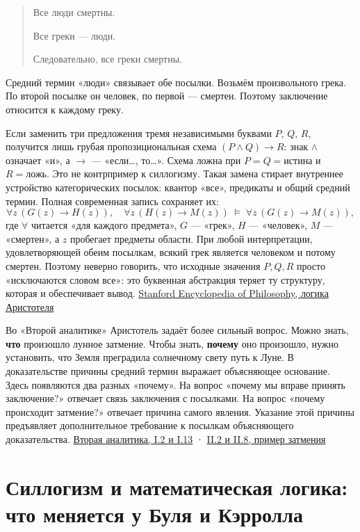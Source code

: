 \documentclass[12pt,a4paper]{article}
\begin{document}
\begin{quote}
Все люди смертны.\par
Все греки — люди.\par
Следовательно, все греки смертны.\par
\end{quote}

Средний термин «люди» связывает обе посылки. Возьмём произвольного грека. По второй посылке он человек, по первой — смертен. Поэтому заключение относится к каждому греку.

Если заменить три предложения тремя независимыми буквами \(P\), \(Q\), \(R\), получится лишь грубая пропозициональная схема \((P\land Q)\to R\): знак \(\land\) означает «и», а \(\to\) — «если…, то…». Схема ложна при \(P=Q=\text{истина}\) и \(R=\text{ложь}\). Это не контрпример к силлогизму. Такая замена стирает внутреннее устройство категорических посылок: квантор «все», предикаты и общий средний термин. Полная современная запись сохраняет их:
\[
\forall z\,(G(z)\to H(z)),\quad \forall z\,(H(z)\to M(z))
\;\models\; \forall z\,(G(z)\to M(z)),
\]
где \(\forall\) читается «для каждого предмета», \(G\) — «грек», \(H\) — «человек», \(M\) — «смертен», а \(z\) пробегает предметы области. При любой интерпретации, удовлетворяющей обеим посылкам, всякий грек является человеком и потому смертен. Поэтому неверно говорить, что исходные значения \(P,Q,R\) просто «исключаются словом все»: это буквенная абстракция теряет ту структуру, которая и обеспечивает вывод. \href{https://plato.stanford.edu/entries/aristotle-logic/}{Stanford Encyclopedia of Philosophy, логика Аристотеля}

Во «Второй аналитике» Аристотель задаёт более сильный вопрос. Можно знать, \textbf{что} произошло лунное затмение. Чтобы знать, \textbf{почему} оно произошло, нужно установить, что Земля преградила солнечному свету путь к Луне. В доказательстве причины средний термин выражает объясняющее основание. Здесь появляются два разных «почему». На вопрос «почему мы вправе принять заключение?» отвечает связь заключения с посылками. На вопрос «почему происходит затмение?» отвечает причина самого явления. Указание этой причины предъявляет дополнительное требование к посылкам объясняющего доказательства. \href{https://classics.mit.edu/Aristotle/posterior.1.i.html}{Вторая аналитика, I.2 и I.13} · \href{https://classics.mit.edu/Aristotle/posterior.2.ii.html}{II.2 и II.8, пример затмения}

\section{Силлогизм и математическая логика: что меняется у Буля и Кэрролла}
\end{document}
